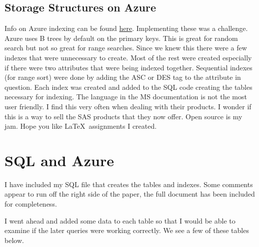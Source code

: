 \documentclass[11pt]{article}
\begin{document}
\subsection{Storage Structures on Azure}
Info on Azure indexing can be found \href{https://learn.microsoft.com/en-us/sql/relational-databases/indexes/indexes?view=sql-server-ver16}{here}.  Implementing these was a challenge.  Azure uses B trees by default on the primary keys.  This is great for random search but not so great for range searches.  Since we knew this there were a few indexes that were unnecessary to create.  Most of the rest were created especially if there were two attributes that were being indexed together.  Sequential indexes (for range sort) were done by adding the ASC or DES tag to the attribute in question.  Each index was created and added to the SQL code creating the tables necessary for indexing.  The language in the MS documentation is not the most user friendly.  I find this very often when dealing with their products.  I wonder if this is a way to sell the SAS products that they now offer.  Open source is my jam.  Hope you like \LaTeX\ assignments I created.

\section{SQL and Azure}

I have included my SQL file that creates the tables and indexes.  Some comments appear to run off the right side of the paper, the full document has been included for completeness.


I went ahead and added some data to each table so that I would be able to examine if the later queries were working correctly.  We see a few of these tables below.
\end{document}
